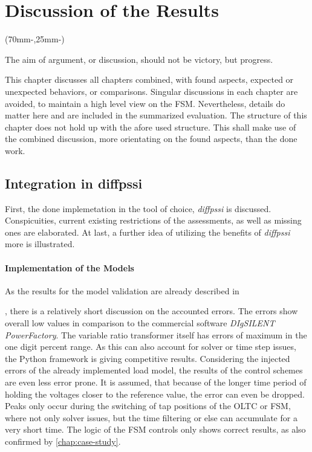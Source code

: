 

\chapter{Discussion of the Results}
\label{chap:discussion}

\begin{textblock*}{.7\textwidth}(70mm-\offset,25mm-\offset)
    \begin{fquote}
        The aim of argument, or discussion, should not be victory, but progress.
    \end{fquote}
\end{textblock*}

This chapter discusses all chapters combined, with found aspects, expected or unexpected behaviors, or comparisons.
Singular discussions in each chapter are avoided, to maintain a high level view on the \acs{FSM}.
Nevertheless, details do matter here and are included in the summarized evaluation.
The structure of this chapter does not hold up with the afore used structure.
This shall make use of the combined discussion, more orientating on the found aspects, than the done work. 

\section{Integration in diffpssi}

First, the done implemetation in the tool of choice, \textit{diffpssi} is discussed.
Conspicuities, current existing restrictions of the assessments, as well as missing ones are elaborated.
At last, a further idea of utilizing the benefits of \textit{diffpssi} more is illustrated.

\subsubsection{Implementation of the Models}

As the results for the model validation are already described in \author{chap:verification}, there is a relatively short discussion on the accounted errors.
The errors show overall low values in comparison to the commercial software \textit{DIgSILENT PowerFactory}.
The variable ratio transformer itself has errors of maximum in the one digit percent range.
As this can also account for solver or time step issues, the Python framework is giving competitive results.
Considering the injected errors of the already implemented load model, the results of the control schemes are even less error prone.
It is assumed, that because of the longer time period of holding the voltages closer to the reference value, the error can even be dropped. 
Peaks only occur during the switching of tap positions of the \acs{OLTC} or \acs{FSM}, where not only solver issues, but the time filtering or else can accumulate for a very short time.
The logic of the \acs{FSM} controls only shows correct results, as also confirmed by \autoref{chap:case-study}.

